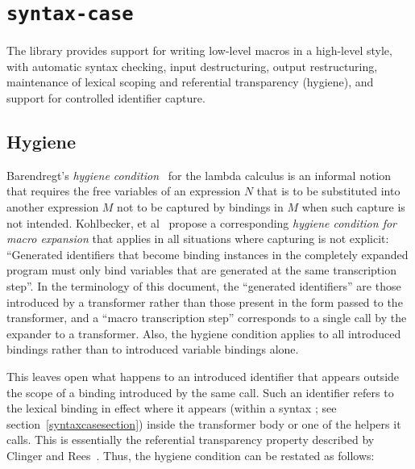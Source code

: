 \chapter{{\tt syntax-case}}
\label{syntaxcasechapter}


The  library
provides
support for writing low-level macros
in a high-level style, with automatic syntax checking, input
destructuring, output restructuring, maintenance of lexical scoping
and referential transparency (hygiene), and support for controlled
identifier capture.

\section{Hygiene}
\label{hygienesection}


Barendregt's \emph{hygiene condition}~\cite{barendregt} for the
lambda calculus is an informal notion that requires the free variables of
an expression $N$ that is to be substituted into another expression $M$ not to
be captured by bindings in $M$ when such capture is not intended.
Kohlbecker, et al~\cite{hygienic} propose a corresponding
\emph{hygiene condition for macro expansion} that applies in all situations
where capturing is not explicit:
``Generated identifiers that become binding instances in
the completely expanded program must only bind variables that
are generated at the same transcription step''.
In the terminology of this document, the ``generated identifiers'' are
those introduced by a transformer rather than those present in the form
passed to the transformer, and a ``macro transcription step'' corresponds
to a single call by the expander to a transformer.
Also, the hygiene condition applies to all introduced bindings rather than
to introduced variable bindings alone.

This leaves open what happens to an introduced identifier that appears
outside the scope of a binding introduced by the same call.
Such an identifier refers to the lexical binding in effect where it
appears (within a {\cf syntax} ;
see section~\ref{syntaxcasesection}) inside the transformer body or one of
the helpers it calls.
This is essentially the referential transparency property described
by Clinger and Rees~\cite{macrosthatwork}.
Thus, the hygiene condition can be restated as follows:

